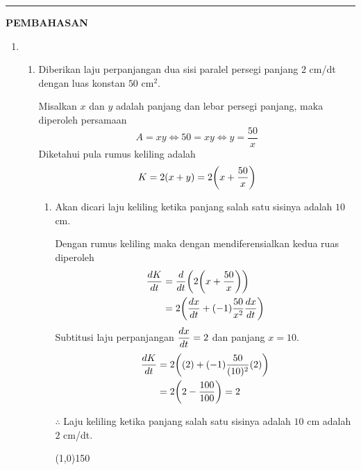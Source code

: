 \vspace{0.2cm}
\hrule height 1pt
\vspace{0.5cm}
\begin{center}
    \textbf{\large{PEMBAHASAN}}
\end{center}
\begin{enumerate}[leftmargin=*, label={\arabic*}.]
\item
\begin{enumerate}[label={\alph*}.]
    \item Diberikan laju perpanjangan dua sisi paralel persegi panjang $2$ cm/dt dengan 
    luas konstan $50$ cm$^{2}$.

    Misalkan $x$ dan $y$ adalah panjang dan lebar persegi panjang, maka diperoleh persamaan
    \[
    A = xy \iff 50 = xy \iff y = \frac{50}{x}
    \]
    Diketahui pula rumus keliling adalah
    \[
    K = 2(x+y) = 2\brk*{x+\frac{50}{x}}
    \]
    \begin{enumerate}[label={\roman*}.]
        \item Akan dicari laju keliling ketika panjang salah satu sisinya adalah $10$ cm.
        
        Dengan rumus keliling maka dengan mendiferensialkan kedua ruas diperoleh
        \begin{align*}
            \frac{dK}{dt} &= \drv{t}{2\brk*{x+\frac{50}{x}}}\\
            &=2\brk*{\frac{dx}{dt}+(-1)\frac{50}{x^{2}}\frac{dx}{dt}}\\
        \end{align*}
        Subtitusi laju perpanjangan $\displaystyle \frac{dx}{dt} = 2$ dan panjang $x=10$.
        \begin{align*}
            \frac{dK}{dt} &=2\brk*{(2)+(-1)\frac{50}{(10)^{2}}(2)}\\
            &=2\brk*{2-\frac{100}{100}} = 2
        \end{align*}

        $\therefore$ Laju keliling ketika panjang salah satu sisinya adalah $10$ cm adalah
        $2$ cm/dt.
\begin{center}
    \line(1,0){150}
\end{center}


\end{enumerate}
\end{enumerate}
\end{enumerate}
